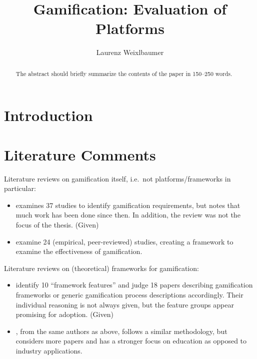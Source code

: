 \documentclass[runningheads]{llncs}
\begin{document}
\title{Gamification: Evaluation of Platforms}
\author{Laurenz Weixlbaumer}
\maketitle

\begin{abstract}
The abstract should briefly summarize the contents of the paper in
150--250 words.
\end{abstract}

\tableofcontents

\section{Introduction}

\appendix

\section{Literature Comments}

Literature reviews on gamification itself, i.e.\ not platforms/frameworks in particular:

\begin{itemize}
    \item\cite{Herz14} examines 37 studies to identify gamification requirements, but notes that much work has been done since then. In addition, the review was not the focus of the thesis. (Given)
    \item\cite{HaKS14} examine 24 (empirical, peer-reviewed) studies, creating a framework to examine the effectiveness of gamification.
\end{itemize}

Literature reviews on (theoretical) frameworks for gamification:

\begin{itemize}
    \item\cite{MRGA15} identify 10 \enquote{framework features} and judge 18 papers describing gamification frameworks or generic gamification process descriptions accordingly. Their individual reasoning is not always given, but the feature groups appear promising for adoption. (Given)
    \item\cite{MRGA17}, from the same authors as above, follows a similar methodology, but considers more papers and has a stronger focus on education as opposed to industry applications.
\end{itemize}
\end{document}
